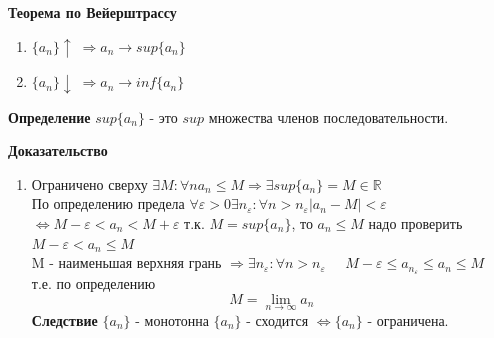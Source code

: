 \documentclass[12pt, paper]{article}
\newcommand{\R}{\mathbb{R}}
\begin{document}
\begin{tcolorbox}
    \textbf{Теорема по Вейерштрассу}
    \begin{enumerate}
        \item $\{a_n\} \uparrow \; \Rightarrow a_n \to sup\{ a_n \}$
        \item $\{a_n\} \downarrow \; \Rightarrow a_n \to inf\{ a_n \}$
    \end{enumerate}
\end{tcolorbox}

\begin{tcolorbox}
    \textbf{Определение}
    $sup \{a_n\}$ - это $sup$ множества членов последовательности.
\end{tcolorbox}

\begin{tcolorbox}[title=Доказательство полноты $\R$ по Вейерштрассу]
    \textbf{Доказательство}
    \begin{enumerate}
        \item Ограничено сверху $\exists M: \forall n a_n \leq M \Rightarrow \exists sup\{a_n\} = M \in \R$\\
        По определению предела $\forall \varepsilon > 0 \exists n_\varepsilon: \forall n > n_\varepsilon |a_n - M| < \varepsilon $\\
        $\Leftrightarrow M-\varepsilon<a_n<M+\varepsilon$ т.к. $M=sup\{a_n\}$, то $a_n \leq M$ надо проверить $M-\varepsilon<a_n\leq M$\\
        M - наименьшая верхняя грань $\Rightarrow \exists n_\varepsilon: \forall n > n_\varepsilon \;\;\;\;\; M-\varepsilon \leq a_{n_\varepsilon} \leq a_n \leq M $\\
        т.е. по определению 
        \[M = \lim_{n\to\infty} a_n\]
        \textbf{Следствие} $\{a_n\}$ - монотонна $\{a_n\}$ - сходится $\Leftrightarrow \{a_n\}$ - ограничена.
    \end{enumerate}
\end{tcolorbox}
\end{document}
